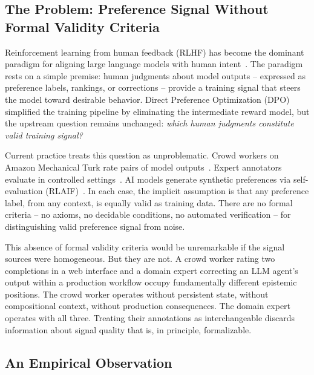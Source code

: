 \documentclass[11pt]{article}
\begin{document}
\subsection{The Problem: Preference Signal Without Formal Validity Criteria}
\label{sec:problem}

Reinforcement learning from human feedback (RLHF) has become the dominant paradigm for aligning large language models with human intent~\citep{christiano2017deep, ouyang2022training}.
The paradigm rests on a simple premise: human judgments about model outputs -- expressed as preference labels, rankings, or corrections -- provide a training signal that steers the model toward desirable behavior.
Direct Preference Optimization (DPO)~\citep{rafailov2023direct} simplified the training pipeline by eliminating the intermediate reward model, but the upstream question remains unchanged: \emph{which human judgments constitute valid training signal?}

Current practice treats this question as unproblematic.
Crowd workers on Amazon Mechanical Turk rate pairs of model outputs~\citep{ouyang2022training}.
Expert annotators evaluate in controlled settings~\citep{bai2022constitutional}.
AI models generate synthetic preferences via self-evaluation (RLAIF)~\citep{lee2023rlaif}.
In each case, the implicit assumption is that any preference label, from any context, is equally valid as training data.
There are no formal criteria -- no axioms, no decidable conditions, no automated verification -- for distinguishing valid preference signal from noise.

This absence of formal validity criteria would be unremarkable if the signal sources were homogeneous.
But they are not.
A crowd worker rating two completions in a web interface and a domain expert correcting an LLM agent's output within a production workflow occupy fundamentally different epistemic positions.
The crowd worker operates without persistent state, without compositional context, without production consequences.
The domain expert operates with all three.
Treating their annotations as interchangeable discards information about signal quality that is, in principle, formalizable.

\subsection{An Empirical Observation}
\label{sec:observation}
\end{document}
